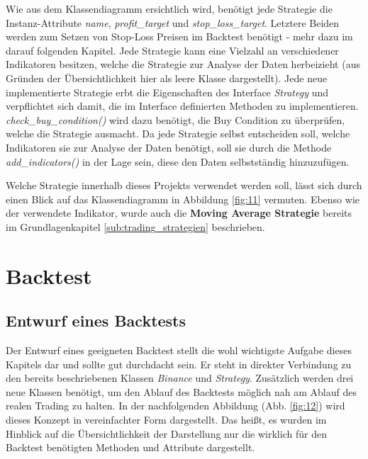 \documentclass[oneside]{ausarbeitung}
\begin{document}
Wie aus dem Klassendiagramm ersichtlich wird, benötigt jede Strategie die Instanz-Attribute \textit{name}, \textit{profit\_target} und \textit{stop\_loss\_target}. Letztere Beiden werden zum Setzen von Stop-Loss Preisen im Backtest benötigt - mehr dazu im darauf folgenden Kapitel. Jede Strategie kann eine Vielzahl an verschiedener Indikatoren besitzen, welche die Strategie zur Analyse der Daten herbeizieht (aus Gründen der Übersichtlichkeit hier als leere Klasse dargestellt). Jede neue implementierte Strategie erbt die Eigenschaften des Interface \textit{Strategy} und verpflichtet sich damit, die im Interface definierten Methoden zu implementieren. \textit{check\_buy\_condition()} wird dazu benötigt, die Buy Condition zu überprüfen, welche die Strategie ausmacht. Da jede Strategie selbst entscheiden soll, welche Indikatoren sie zur Analyse der Daten benötigt, soll sie durch die Methode \textit{add\_indicators()} in der Lage sein, diese den Daten selbstständig hinzuzufügen.

Welche Strategie innerhalb dieses Projekts verwendet werden soll, lässt sich durch einen Blick auf das Klassendiagramm in Abbildung \ref{fig:11} vermuten. Ebenso wie der verwendete Indikator, wurde auch die \textbf{Moving Average Strategie} bereits im Grundlagenkapitel \ref{sub:trading_strategien} beschrieben.


\section{Backtest}
\label{sec:backtest}

\subsection{Entwurf eines Backtests}
\label{sub:entwurf_eines_backtests}

Der Entwurf eines geeigneten Backtest stellt die wohl wichtigste Aufgabe dieses Kapitels dar und sollte gut durchdacht sein. Er steht in direkter Verbindung zu den bereits beschriebenen Klassen \textit{Binance} und \textit{Strategy}. Zusätzlich werden drei neue Klassen benötigt, um den Ablauf des Backtests möglich nah am Ablauf des realen Trading zu halten. In der nachfolgenden Abbildung (Abb. \ref{fig:12}) wird dieses Konzept in vereinfachter Form dargestellt. Das heißt, es wurden im Hinblick auf die Übersichtlichkeit der Darstellung nur die wirklich für den Backtest benötigten Methoden und Attribute dargestellt.
\end{document}
